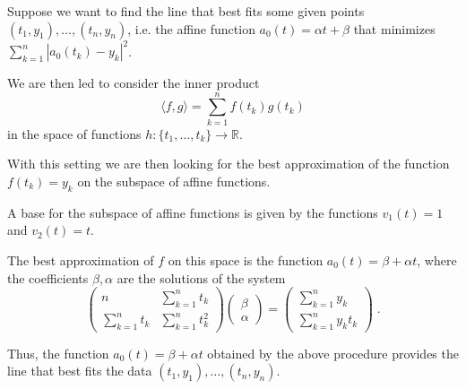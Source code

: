 \documentclass[12pt]{article}
\begin{document}
Suppose we want to find the line that best fits some given points $(t_1, y_1), \dots, (t_n, y_n)$, i.e. the affine function $a_0(t) = \alpha t + \beta$ that minimizes $\displaystyle \sum_{k = 1}^n |a_0(t_k) - y_k|^2$.

We are then led to consider the inner product
\begin{displaymath}
\langle f, g \rangle = \sum_{k=1}^n f(t_k)g(t_k)
\end{displaymath}
in the space of functions $h:\{t_1, \dots, t_k\} \longrightarrow \mathbb{R}$.

With this setting we are then looking for the best approximation of the function $f(t_k)=y_k$ on the subspace of affine functions.

A base for the subspace of affine functions is given by the functions $v_1(t) = 1$ and $v_2(t) = t$.

The best approximation of $f$ on this space is the function $a_0(t) = \beta + \alpha t$, where the coefficients $\beta, \alpha$ are the solutions of the system
\begin{displaymath}
\begin{pmatrix}
n & \sum_{k=1}^n t_k \\
\sum_{k=1}^n t_k & \sum_{k=1}^n t_k^2
\end{pmatrix}
\begin{pmatrix}
\beta\\
\alpha
\end{pmatrix} = 
\begin{pmatrix}
\sum_{k=1}^n y_k\\
\sum_{k=1}^n y_k t_k
\end{pmatrix} \; .
\end{displaymath}

Thus, the function $a_0(t) = \beta + \alpha t$ obtained by the above procedure provides the line that best fits the data $(t_1, y_1), \dots, (t_n, y_n)$.
\end{document}
